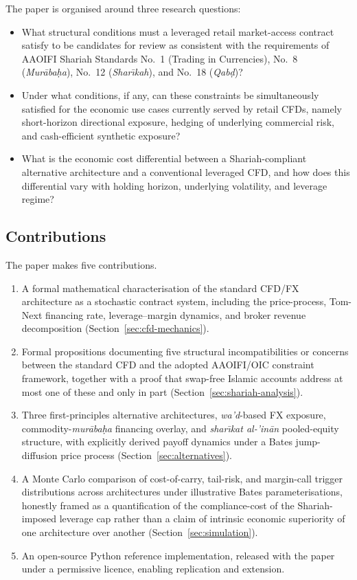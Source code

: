 \documentclass[preprint,12pt,authoryear]{elsarticle}
\theoremstyle{definition}
\begin{document}
The paper is organised around three research questions:
\begin{itemize}
  \item[\textbf{RQ1.}] What structural conditions must a leveraged
  retail market-access contract satisfy to be candidates for review
  as consistent with the requirements of AAOIFI Shariah Standards
  No.~1 (Trading in Currencies), No.~8 (\emph{Mur\={a}ba\d{h}a}),
  No.~12 (\emph{Shar\={\i}kah}), and No.~18 (\emph{Qab\d{d}})?
  \item[\textbf{RQ2.}] Under what conditions, if any, can these
  constraints be simultaneously satisfied for the economic use cases
  currently served by retail CFDs, namely short-horizon directional
  exposure, hedging of underlying commercial risk, and cash-efficient
  synthetic exposure?
  \item[\textbf{RQ3.}] What is the economic cost differential between a
  Shariah-compliant alternative architecture and a conventional
  leveraged CFD, and how does this differential vary with holding
  horizon, underlying volatility, and leverage regime?
\end{itemize}

\subsection{Contributions}
\label{sec:contributions}

The paper makes five contributions.
\begin{enumerate}
  \item A formal mathematical characterisation of the standard CFD/FX
  architecture as a stochastic contract system, including the
  price-process, Tom-Next financing rate, leverage--margin dynamics,
  and broker revenue decomposition
  (Section~\ref{sec:cfd-mechanics}).
  \item Formal propositions documenting five structural
  incompatibilities or concerns between the standard CFD and the
  adopted AAOIFI/OIC constraint framework, together with a proof
  that swap-free Islamic accounts address at most one of these and
  only in part (Section~\ref{sec:shariah-analysis}).
  \item Three first-principles alternative architectures,
  \emph{wa'd}-based FX exposure, commodity-\emph{mur\={a}ba\d{h}a}
  financing overlay, and \emph{shar\={\i}kat al-'in\={a}n}
  pooled-equity structure, with explicitly derived payoff dynamics
  under a Bates jump-diffusion price process
  (Section~\ref{sec:alternatives}).
  \item A Monte Carlo comparison of cost-of-carry, tail-risk, and
  margin-call trigger distributions across architectures under
  illustrative Bates parameterisations, honestly framed as a
  quantification of the compliance-cost of the Shariah-imposed
  leverage cap rather than a claim of intrinsic economic superiority
  of one architecture over another
  (Section~\ref{sec:simulation}).
  \item An open-source Python reference implementation, released with
  the paper under a permissive licence, enabling replication and
  extension.
\end{enumerate}
\end{document}
